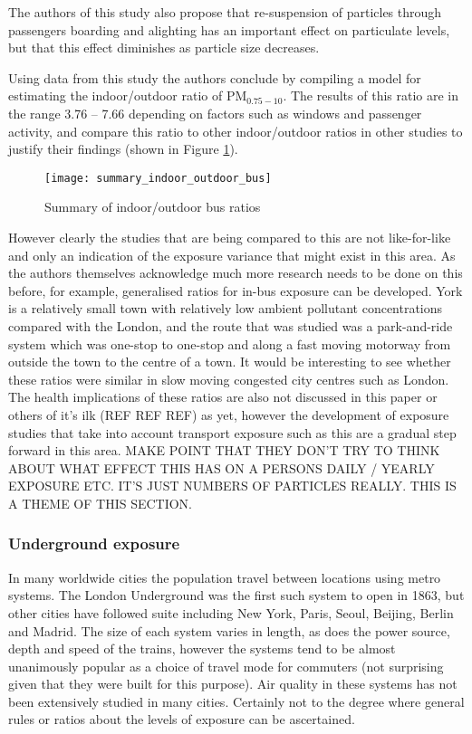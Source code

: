 The authors of this study also propose that re-suspension of particles through passengers boarding and alighting has an important effect on particulate levels, but that this effect diminishes as particle size decreases.\medskip

Using data from this study the authors conclude by compiling a model for estimating the indoor/outdoor ratio of PM$_{0.75-10}$. The results of this ratio are in the range 3.76 – 7.66 depending on factors such as windows and passenger activity, and compare this ratio to other indoor/outdoor ratios in other studies to justify their findings (shown in Figure \ref{fig:summary_indoor_outdoor_bus}).

\begin{figure}[H]
\centering
\texttt{[image: summary\_indoor\_outdoor\_bus]}
\caption{Summary of indoor/outdoor bus ratios}
\label{fig:summary_indoor_outdoor_bus}
\end{figure}

However clearly the studies that are being compared to this are not like-for-like and only an indication of the exposure variance that might exist in this area. As the authors themselves acknowledge much more research needs to be done on this before, for example, generalised ratios for in-bus exposure can be developed. York is a relatively small town with relatively low ambient pollutant concentrations compared with the London, and the route that was studied was a park-and-ride system which was one-stop to one-stop and along a fast moving motorway from outside the town to the centre of a town. It would be interesting to see whether these ratios were similar in slow moving congested city centres such as London. The health implications of these ratios are also not discussed in this paper or others of it’s ilk (REF REF REF) as yet, however the development of exposure studies that take into account transport exposure such as this are a gradual step forward in this area. MAKE POINT THAT THEY DON’T TRY TO THINK ABOUT WHAT EFFECT THIS HAS ON A PERSONS DAILY / YEARLY EXPOSURE ETC. IT’S JUST NUMBERS OF PARTICLES REALLY. THIS IS A THEME OF THIS SECTION.\medskip

\subsubsection{Underground exposure}
\label{subsubsec:undergroundexposure}

In many worldwide cities the population travel between locations using metro systems. The London Underground was the first such system to open in 1863, but other cities have followed suite including New York, Paris, Seoul, Beijing, Berlin and Madrid. The size of each system varies in length, as does the power source, depth and speed of the trains, however the systems tend to be almost unanimously popular as a choice of travel mode for commuters (not surprising given that they were built for this purpose).  Air quality in these systems has not been extensively studied in many cities. Certainly not to the degree where general rules or ratios about the levels of exposure can be ascertained.\medskip

